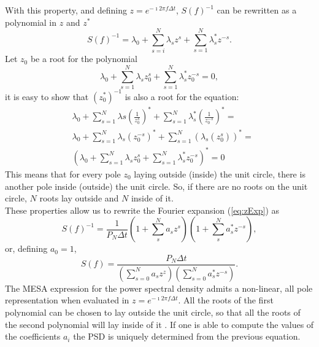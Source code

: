 \documentclass[twocolumn,showpacs,preprintnumbers,nofootinbib,prd,
superscriptaddress,10pt]{revtex4-1}
\begin{document}
With this property, and defining $z = e^{-\imath 2 \pi f \Delta t}$, $S(f)^{-1}$ can be rewritten as a polynomial in $z$ and $z^*$
\begin{equation}
    \label{eq:zExp}
    S(f)^{-1} = \lambda_0 + \sum_{s = i}^N \lambda_s z^s + \sum_{s = 1}^N \lambda^*_s z^{-s}.
\end{equation}
Let $z_0$ be a root for the polynomial
\begin{equation}
    \nonumber
    \lambda_0 + \sum_{s = 1}^N \lambda_s z_0^s + \sum_{s = 1}^N \lambda^*_s z_0^{-s} = 0,
\end{equation}
it is easy to show that $(z_0^*)^{-1}$ is also a root for the equation: 
\begin{align}
    \nonumber 
    &\lambda_0 + \sum_{s = 1}^{N} \lambda s \left(\frac{1}{z_0^s} \right)^* + \sum_{s = 1}^N \lambda^*_s \left(\frac{1 }{z_0^{-s}}\right)^* = \\ \nonumber 
    &\lambda_0 + \sum_{s = 1}^N \lambda_s (z_0^{-s})^* + \sum_{s=1}^N \left(\lambda_s (z_0^s)\right)^* = \\ \nonumber 
    &\left(\lambda_0 + \sum_{s=1}^N \lambda_s z_0^s + \sum_{s = 1}^N \lambda^*_s z_0^{-s}\right)^* = 0 
\end{align}
This means that for every pole $z_0$ laying outside (inside) the unit circle, there is another pole inside (outside) the unit circle.  So, if there are no roots on the unit circle, $N$ roots lay outside and $N$ inside of it. \\ 
These properties allow us to rewrite the Fourier expansion (\ref{eq:zExp}) as \cite{1975STIN...7714318B}
\begin{equation}\nonumber 
    S(f)^{-1} = \frac{1}{P_N \Delta t} \left(1 + \sum_{s}^N a_s z^s\right)\left(1 + \sum_s^N  a^*_s z^{-s}\right),
\end{equation}
or, defining $a_0 = 1$,
\begin{equation}\label{eq:MESApsd_appendix}
    S(f) = \frac{P_N \Delta t}{\left(\sum_{s=0}^N a_s z^z\right)\left(\sum_{s = 0}^N a^*_s z^{-s}\right)}. 
\end{equation}
The MESA expression for the power spectral density admits a non-linear, all pole representation when evaluated in $z = e^{-\imath 2 \pi f \Delta t}$. All the roots of the first polynomial can be chosen to lay outside the unit circle, so that all the roots of the second polynomial will lay inside of it \cite{1975STIN...7714318B}. 
If one is able to compute the values of the coefficients $a_i$ the PSD is uniquely determined from the previous equation. \\ 
\end{document}
